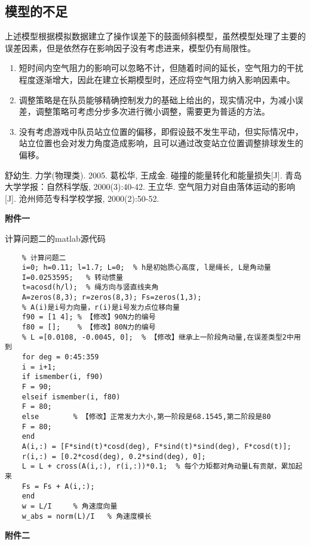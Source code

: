 \documentclass[withoutpreface,bwprint]{cumcmthesis} %
\begin{document}
\subsection{模型的不足}
上述模型根据模拟数据建立了操作误差下的鼓面倾斜模型，虽然模型处理了主要的误差因素，但是依然存在影响因子没有考虑进来，模型仍有局限性。
\begin{enumerate}
\item 短时间内空气阻力的影响可以忽略不计，但随着时间的延长，空气阻力的干扰程度逐渐增大，因此在建立长期模型时，还应将空气阻力纳入影响因素中。
\item 调整策略是在队员能够精确控制发力的基础上给出的，现实情况中，为减小误差，调整策略可考虑分步多次进行微小调整，需要更为普适的方法。
\item 没有考虑游戏中队员站立位置的偏移，即假设鼓不发生平动，但实际情况中，站立位置也会对发力角度造成影响，且可以通过改变站立位置调整排球发生的偏移。
\end{enumerate}
\newpage

\begin{thebibliography}{9}%
    舒幼生. 力学(物理类). 2005.
     葛松华, 王成金. 碰撞的能量转化和能量损失[J]. 青岛大学学报：自然科学版, 2000(3):40-42.
    王立华. 空气阻力对自由落体运动的影响[J]. 沧州师范专科学校学报, 2000(2):50-52.
\end{thebibliography}


\newpage
\textbf{{\Large 附件一}}

计算问题二的matlab源代码

\begin{lstlisting}
	% 计算问题二
	i=0; h=0.11; l=1.7; L=0;  % h是初始质心高度, l是绳长, L是角动量
	I=0.0253595;   % 转动惯量
	t=acosd(h/l);  % 绳方向与竖直线夹角
	A=zeros(8,3); r=zeros(8,3); Fs=zeros(1,3);
	% A(i)是i号力向量，r(i)是i号发力点位移向量
	f90 = [1 4]; % 【修改】90N力的编号
	f80 = [];    % 【修改】80N力的编号
	% L =[0.0108, -0.0045, 0];  % 【修改】继承上一阶段角动量,在误差类型2中用到
	for deg = 0:45:359
	i = i+1;
	if ismember(i, f90) 
	F = 90;
	elseif ismember(i, f80)
	F = 80;
	else        % 【修改】正常发力大小,第一阶段是68.1545,第二阶段是80
	F = 80;
	end
	A(i,:) = [F*sind(t)*cosd(deg), F*sind(t)*sind(deg), F*cosd(t)];
	r(i,:) = [0.2*cosd(deg), 0.2*sind(deg), 0];
	L = L + cross(A(i,:), r(i,:))*0.1;  % 每个力矩都对角动量L有贡献，累加起来
	Fs = Fs + A(i,:);
	end
	w = L/I     % 角速度向量
	w_abs = norm(L)/I   % 角速度模长
\end{lstlisting}

\newpage
\textbf{{\Large 附件二}}
\end{document}
